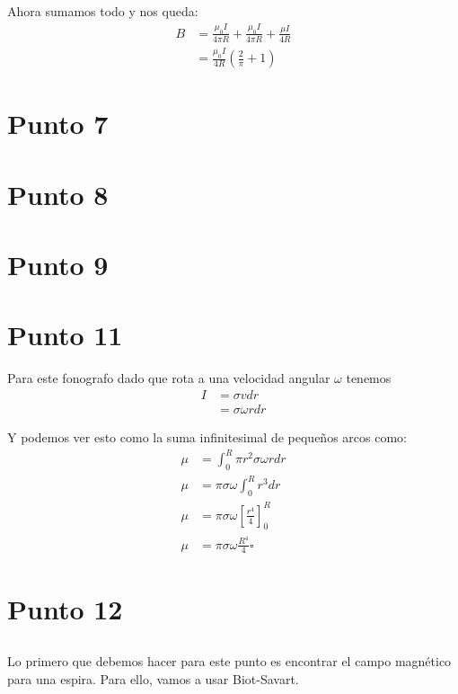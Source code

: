 \documentclass{report}
\begin{document}
Ahora sumamos todo y nos queda:
\begin{align*}
	B &= \frac{\mu_0 I}{4\pi R} + \frac{\mu_0 I}{4\pi R} + \frac{\mu I}{4 R}\\
	&= \frac{\mu_0 I}{4R} \left(\frac{2}{\pi} + 1 \right)
\end{align*}



\chapter{Punto 7}

\chapter{Punto 8}

\chapter{Punto 9}

\chapter{Punto 11}

Para este fonografo dado que rota a una velocidad angular $\omega$ tenemos
\begin{align*}
	I &= \sigma v dr\\
	&= \sigma \omega r dr
\end{align*}

Y podemos ver esto como la suma infinitesimal de pequeños arcos como:
\begin{align*}
	\mu &= \int_0^R \pi r^2 \sigma \omega r dr\\
	\mu &= \pi \sigma \omega \int_0^R r^3 dr\\
	\mu &= \pi \sigma \omega \left[ \frac{r^4}{4} \right]_0^R\\
	\mu &= \pi \sigma \omega \frac{R^4}{4} \square
\end{align*}

\chapter{Punto 12}

\section{}

Lo primero que debemos hacer para este punto es encontrar el campo magnético para una espira. Para ello, vamos a usar Biot-Savart.
\end{document}
